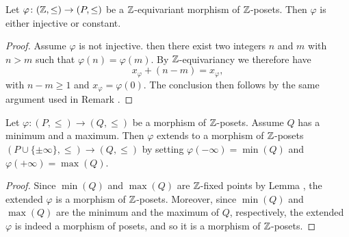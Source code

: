 \begin{lemma}
Let $\varphi\colon(\mathbb{Z} ,\leq)\to (P,\leq)$ be a $\mathbb{Z} $\hyp{}equivariant morphism of $\mathbb{Z} $\hyp{}posets. Then $\varphi$ is either injective or constant.
\end{lemma}
\begin{proof}
Assume $\varphi$ is not injective. then there exist two integers $n$ and $m$ with $n>m$ such that $\varphi(n)=\varphi(m)$. By $\mathbb{Z} $\hyp{}equivariancy we therefore have
\[
x_\varphi+(n-m)=x_\varphi,
\]
with $n-m\geq 1$ and $x_\varphi=\varphi(0)$. The conclusion then follows by the same argument used in Remark .
\end{proof}
\begin{lemma}\label{extends}
Let $\varphi\colon (P,\leq)\to (Q,\leq)$ be a morphism of $\mathbb{Z} $\hyp{}posets. Assume $Q$ has a minimum and a maximum. Then $\varphi$ extends to a morphism of $\mathbb{Z} $\hyp{}posets $(P\cup\{\pm\infty\},\leq)\to (Q,\leq)$ by setting $\varphi(-\infty)=\min(Q)$ and $\varphi(+\infty)=\max(Q)$.
\end{lemma}
\begin{proof}
Since $\min(Q)$ and $\max(Q)$ are $\mathbb{Z} $\hyp{}fixed points by Lemma , the extended $\varphi$ is a morphism of $\mathbb{Z} $\hyp{}posets. Moreover, since $\min(Q)$ and $\max(Q)$ are the minimum and the maximum of $Q$, respectively, the extended $\varphi$ is indeed a morphism of posets, and so it is a morphism of $\mathbb{Z} $\hyp{}posets.
\end{proof}
